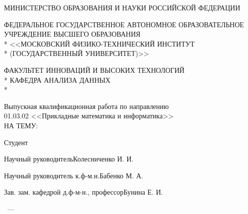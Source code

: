 \thispagestyle{empty}%
\begin{center}%

МИНИСТЕРСТВО ОБРАЗОВАНИЯ И НАУКИ РОССИЙСКОЙ ФЕДЕРАЦИИ \\
\bigskip

\MakeUppercase{Федеральное государственное автономное образовательное учреждение высшего образования} \\*
<<МОСКОВСКИЙ ФИЗИКО-ТЕХНИЧЕСКИЙ ИНСТИТУТ \\*
(ГОСУДАРСТВЕННЫЙ УНИВЕРСИТЕТ)>> \\
\bigskip

ФАКУЛЬТЕТ ИННОВАЦИЙ И ВЫСОКИХ ТЕХНОЛОГИЙ \\*
КАФЕДРА АНАЛИЗА ДАННЫХ \\*
\hrulefill
\end{center}%

\begin{center}%
\vspace{0pt plus3fill} %
\large
Выпускная квалификационная работа по направлению \\
01.03.02 <<Прикладные математика и информатика>> \\
НА ТЕМУ:
\vspace{0pt plus2fill}

\textbf {\large \thesisTitle}
\end{center}%
%
\vspace{0pt plus4fill} %
\noindent
Студент\hrulefill\thesisAuthorShort
\medskip

\noindent
Научный руководитель\hrulefill{}Колесниченко И. И.%
\medskip

\noindent
Научный руководитель к.ф-м.н.\hrulefill{}Бабенко М. А.%
\medskip

\noindent
Зав. зам. кафедрой д.ф-м-н., профессор\hrulefill{}Бунина Е. И.%
%
\vspace{0pt plus1.5fill} %
\begin{center}%
{\thesisCity~--- \thesisYear}
\end{center}%
\newpage
